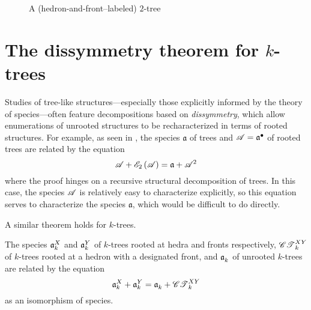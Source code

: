 \documentclass[distribution,draft]{brandiss} %
\numberwithin{section}{chapter}
\numberwithin{figure}{chapter}
\begin{document}
\begin{figure}[htb]
  \centering
  \caption{A (hedron-and-front--labeled) $2$-tree}
  \label{fig:exlab2tree}
\end{figure}

\section{The dissymmetry theorem for $k$-trees}\label{s:dissymk}
Studies of tree-like structures---especially those explicitly informed by the theory of species---often feature decompositions based on \emph{dissymmetry}, which allow enumerations of unrooted structures to be recharacterized in terms of rooted structures.
For example, as seen in \cite[\S 4.1]{bll:species}, the species $\mathfrak{a}$ of trees and $\mathscr{A} =  {\mathfrak{a}}^{\bullet } $ of rooted trees are related by the equation
\begin{equation*}
  \mathscr{A} + \mathscr{E}_{2} \left( {\mathscr{A}} \right) = \mathfrak{a} + \mathscr{A}^{2}
\end{equation*}
where the proof hinges on a recursive structural decomposition of trees.
In this case, the species $\mathscr{A}$ is relatively easy to characterize explicitly, so this equation serves to characterize the species $\mathfrak{a}$, which would be difficult to do directly.

A similar theorem holds for $k$-trees.
\begin{theorem}
  \label{thm:dissymk}
  The species $\mathfrak{a}_{k}^{X}$ and $\mathfrak{a}_{k}^{Y}$ of $k$-trees rooted at hedra and fronts respectively, $\mathscr{CT}_{k}^{XY}$ of $k$-trees rooted at a hedron with a designated front, and $\mathfrak{a}_{k}^{}$ of unrooted $k$-trees are related by the equation
  \begin{equation}
    \label{eq:dissymk}
    \mathfrak{a}_{k}^{X} + \mathfrak{a}_{k}^{Y} = \mathfrak{a}_{k}^{} + \mathscr{CT}_{k}^{XY}
  \end{equation}
  as an isomorphism of species.
\end{theorem}
\end{document}

